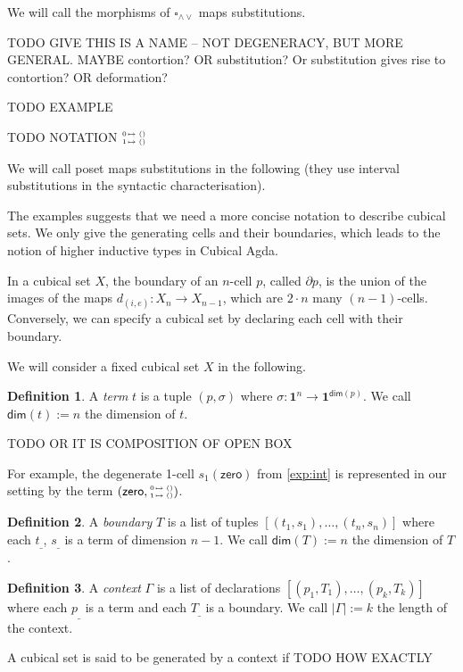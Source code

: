 \documentclass[11pt]{article}
\theoremstyle{definition}
\newtheorem{definition}{Definition}
\newcommand{\mdef}{:=}
\newcommand{\mname}[1]{\textit{{#1}}}
\newcommand{\join}{\wedge}
\newcommand{\meet}{\vee}
\newcommand{\dedekind}{\square_{\join \meet}}
\newcommand{\pint}[1]{\mathbf{1}^{#1}}
\renewcommand{\dim}[1]{\mathsf{dim}({#1})}
\newcommand{\ctxtdim}[1]{|{#1}|}
\newcommand{\smap}[1]{s_{{#1}}}
\newcommand{\dmap}[2]{d_{({#1} , {#2})}}
\newcommand{\cset}[1]{\mathsf{{#1}}}
\newcommand{\substtwo}[2]{\tiny
  \arraycolsep=.4pt\def\arraystretch{1}
  \begin{array}{ll}
    0 &\mapsto {#1} \\
    1 &\mapsto {#2}
  \end{array}
}
\newcommand{\constzero}{\substtwo{()}{()}}
\begin{document}
We will call the morphisms of $\dedekind$ maps substitutions.

TODO GIVE THIS IS A NAME -- NOT DEGENERACY, BUT MORE GENERAL. MAYBE contortion?
OR substitution? Or substitution gives rise to contortion?
OR deformation?

TODO EXAMPLE

TODO NOTATION $\constzero$ 

We will call poset maps substitutions in the following (they use interval
substitutions in the syntactic characterisation).



The examples suggests that we need a more concise notation to describe cubical
sets. We only give the generating cells and their boundaries, which leads to the
notion of higher inductive types in Cubical Agda.

In a cubical set $X$, the boundary of an $n$-cell $p$, called $\partial p$, is
the union of the images of the maps $\dmap{i}{e} : X_n \to X_{n-1}$, which are
$2 \cdot n$ many $(n-1)$-cells. Conversely, we can specify a cubical set by
declaring each cell with their boundary. 


We will consider a fixed cubical set $X$ in the following.

\begin{definition}
  A \mname{term} $t$ is a tuple $(p, \sigma)$ where $\sigma : \pint{n} \to
  \pint{\dim{p}}$. We call $\dim{t} \mdef n$ the dimension of $t$.

  TODO OR IT IS COMPOSITION OF OPEN BOX
\end{definition}

For example, the degenerate 1-cell $\smap{1}(\cset{zero})$ from \autoref{exp:int}
is represented in our setting by the term $(\cset{zero}, \constzero)$.

\begin{definition}
  A \mname{boundary} $T$ is a list of tuples $[(t_1,s_1) , \ldots , (t_n,s_n)]$
  where each $t_\_$, $s_\_$ is a term of dimension $n-1$. We call $\dim{T} \mdef n$ the dimension of $T$.
\end{definition}

\begin{definition}
  A \mname{context} $\Gamma$ is a list of declarations $[ (p_1,T_1) , \ldots , (p_k,T_k)]$
  where each $p_\_$ is a term and each $T_\_$ is a boundary. We call
  $\ctxtdim{\Gamma} \mdef k$ the length of the context.
\end{definition}

A cubical set is said to be generated by a context if TODO HOW EXACTLY
\end{document}
